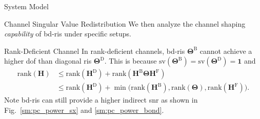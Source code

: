 \documentclass[journal]{IEEEtran}
\begin{document}
\begin{section}{System Model}
\begin{subsection}{Channel Singular Value Redistribution}
		We then analyze the channel shaping \emph{capability} of \gls{bd}-\gls{ris} under specific setups.
		\begin{subsubsection}{Rank-Deficient Channel}
			\label{sc:pc_rank_deficient}
			In rank-deficient channels, \gls{bd}-\gls{ris} $\mathbf{\Theta}^\mathrm{B}$ cannot achieve a higher \gls{dof} than diagonal \gls{ris} $\mathbf{\Theta}^\mathrm{D}$.
			This is because $\mathrm{sv}(\mathbf{\Theta}^\mathrm{B}) = \mathrm{sv}(\mathbf{\Theta}^\mathrm{D}) = \boldsymbol{1}$ and
			\begin{equation}
				\begin{split}
					\mathrm{rank}(\mathbf{H})
					& \le \mathrm{rank}(\mathbf{H}^\mathrm{D}) + \mathrm{rank}(\mathbf{H}^\mathrm{B} \mathbf{\Theta} \mathbf{H}^\mathrm{F}) \\
					& \le \mathrm{rank}(\mathbf{H}^\mathrm{D}) + \min \bigl( \mathrm{rank}(\mathbf{H}^\mathrm{B}), \mathrm{rank}(\mathbf{\Theta}), \mathrm{rank}(\mathbf{H}^\mathrm{F}) \bigr).
				\end{split}
			\end{equation}
			Note \gls{bd}-\gls{ris} can still provide a higher indirect \gls{snr} as shown in Fig.~\ref{sm:pc_power_sx} and \ref{sm:pc_power_bond}.
		\end{subsubsection}



\end{subsection}
\end{section}
\end{document}

